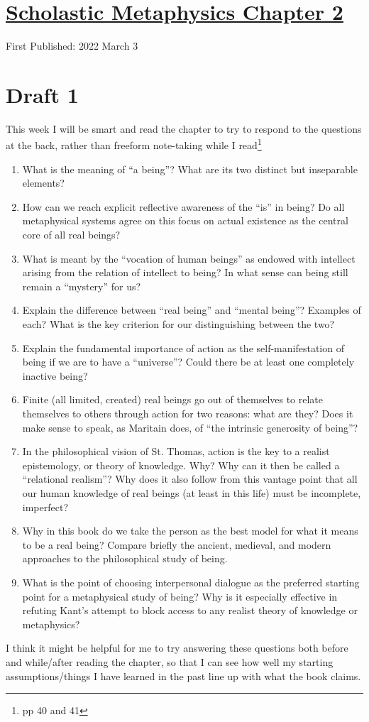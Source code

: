 \documentclass[12pt]{article}[titlepage]
\newcommand{\say}[1]{``#1''}
\newcommand{\1}{\={a}}
\newcommand{\2}{\={e}}
\newcommand{\3}{\={\i}}
\newcommand{\4}{\=o}
\newcommand{\5}{\=u}
\newcommand{\6}{\={A}}
\renewcommand{\,}{\textsuperscript{,}}
\begin{document}
\doublespacing
\section{\href{scholastic-metaphysics-3.html}{Scholastic Metaphysics Chapter 2}}
First Published: 2022 March 3

\section{Draft 1}
This week I will be smart and read the chapter to try to respond to the questions at the back, rather than freeform note-taking while I read\footnote{pp 40 and 41}
\begin{enumerate}
\item What is the meaning of \say{a being}?
What are its two distinct but inseparable elements?
\item How can we reach explicit reflective awareness of the \say{is} in being?
Do all metaphysical systems agree on this focus on actual existence as the central core of all real beings?
\item What is meant by the \say{vocation of human beings} as endowed with intellect arising from the relation of intellect to being?
In what sense can being still remain a \say{mystery} for us?
\item Explain the difference between \say{real being} and \say{mental being}?
Examples of each?
What is the key criterion for our distinguishing between the two?
\item Explain the fundamental importance of action as the self-manifestation of being if we are to have a \say{universe}?
Could there be at least one completely inactive being?
\item Finite (all limited, created) real beings go out of themselves to relate themselves to others through action for two reasons: what are they?
Does it make sense to speak, as Maritain does, of \say{the intrinsic generosity of being}?
\item In the philosophical vision of St. Thomas, action is the key to a realist epistemology, or theory of knowledge.
Why?
Why can it then be called a \say{relational realism}?
Why does it also follow from this vantage point that all our human knowledge of real beings (at least in this life) must be incomplete, imperfect?
\item Why in this book do we take the person as the best model for what it means to be a real being?
Compare briefly the ancient, medieval, and modern approaches to the philosophical study of being.
\item What is the point of choosing interpersonal dialogue as the preferred starting point for a metaphysical study of being?
Why is it especially effective in refuting Kant's attempt to block access to any realist theory of knowledge or metaphysics?
\end{enumerate}
I think it might be helpful for me to try answering these questions both before and while/after reading the chapter, so that I can see how well my starting assumptions/things I have learned in the past line up with what the book claims.
\end{document}

